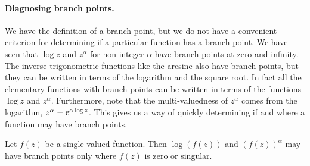 \paragraph{Diagnosing branch points.}
We have the definition of a branch point, but we do not have a convenient
criterion for determining if a particular function has a branch point.
We have seen that $\log z$ and $z^\alpha$ for non-integer $\alpha$ have
branch points at zero and infinity.  The inverse trigonometric functions
like the arcsine also have branch points, but they can be written in terms
of the logarithm and the square root.  In fact all the elementary functions
with branch points can be written in terms of the functions $\log z$ and 
$z^\alpha$.  Furthermore, note that the multi-valuedness of $z^\alpha$
comes from the logarithm,  $z^\alpha = \mathop{\mathrm{e}}\nolimits^{\alpha \log z}$.
This gives us a way of quickly determining if and where a function
may have branch points.


\begin{Result}
  Let $f(z)$ be a single-valued function.  Then $\log(f(z))$ and 
  $(f(z))^\alpha$ may have branch points only where $f(z)$ is zero or singular.
\end{Result}








